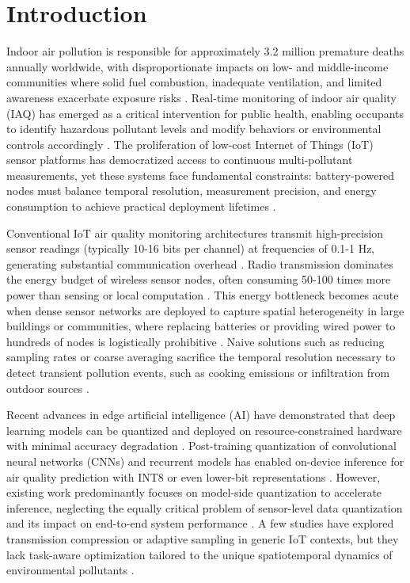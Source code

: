 \section{Introduction}

Indoor air pollution is responsible for approximately 3.2 million premature deaths annually worldwide, with disproportionate impacts on low- and middle-income communities where solid fuel combustion, inadequate ventilation, and limited awareness exacerbate exposure risks \cite{karmakar2024exploring}. Real-time monitoring of indoor air quality (IAQ) has emerged as a critical intervention for public health, enabling occupants to identify hazardous pollutant levels and modify behaviors or environmental controls accordingly \cite{quang2025ai, wang2025indoor}. The proliferation of low-cost Internet of Things (IoT) sensor platforms has democratized access to continuous multi-pollutant measurements, yet these systems face fundamental constraints: battery-powered nodes must balance temporal resolution, measurement precision, and energy consumption to achieve practical deployment lifetimes \cite{przystupa2025ensuring, petrica2026realtime}.

Conventional IoT air quality monitoring architectures transmit high-precision sensor readings (typically 10-16 bits per channel) at frequencies of 0.1-1 Hz, generating substantial communication overhead \cite{lopes2025lowcost, bakare2026iot}. Radio transmission dominates the energy budget of wireless sensor nodes, often consuming 50-100 times more power than sensing or local computation \cite{khan2024artificial}. This energy bottleneck becomes acute when dense sensor networks are deployed to capture spatial heterogeneity in large buildings or communities, where replacing batteries or providing wired power to hundreds of nodes is logistically prohibitive \cite{zaid2025investigating, bagkis2025evolving}. Naive solutions such as reducing sampling rates or coarse averaging sacrifice the temporal resolution necessary to detect transient pollution events, such as cooking emissions or infiltration from outdoor sources \cite{karmakar2024indoor}.

Recent advances in edge artificial intelligence (AI) have demonstrated that deep learning models can be quantized and deployed on resource-constrained hardware with minimal accuracy degradation \cite{mazinani2025air, fici2025sensors}. Post-training quantization of convolutional neural networks (CNNs) and recurrent models has enabled on-device inference for air quality prediction with INT8 or even lower-bit representations \cite{davoli2024edge}. However, existing work predominantly focuses on model-side quantization to accelerate inference, neglecting the equally critical problem of sensor-level data quantization and its impact on end-to-end system performance \cite{himeur2024edge}. A few studies have explored transmission compression or adaptive sampling in generic IoT contexts, but they lack task-aware optimization tailored to the unique spatiotemporal dynamics of environmental pollutants \cite{rojek2026impact, gunasekar2025power}.


